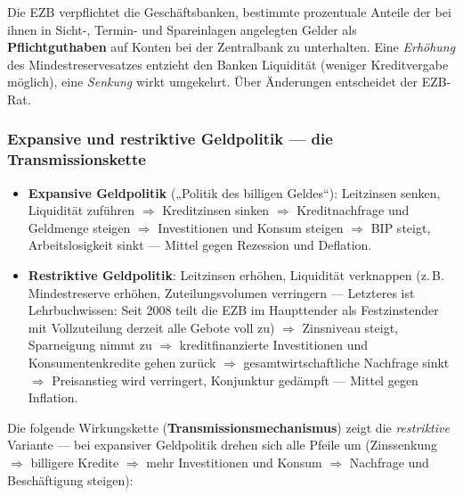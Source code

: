 \documentclass[11pt, a4paper]{article}
\begin{document}
Die EZB verpflichtet die Geschäftsbanken, bestimmte prozentuale Anteile der bei ihnen in
Sicht-, Termin- und Spareinlagen angelegten Gelder als \textbf{Pflichtguthaben} auf Konten
bei der Zentralbank zu unterhalten. Eine \emph{Erhöhung} des Mindestreservesatzes entzieht
den Banken Liquidität (weniger Kreditvergabe möglich), eine \emph{Senkung} wirkt umgekehrt.
Über Änderungen entscheidet der EZB-Rat.

\subsubsection{Expansive und restriktive Geldpolitik --- die Transmissionskette}

\begin{itemize}
  \item \textbf{Expansive Geldpolitik} („Politik des billigen Geldes``): Leitzinsen senken,
    Liquidität zuführen $\Rightarrow$ Kreditzinsen sinken $\Rightarrow$ Kreditnachfrage und
    Geldmenge steigen $\Rightarrow$ Investitionen und Konsum steigen $\Rightarrow$ BIP
    steigt, Arbeitslosigkeit sinkt --- Mittel gegen Rezession und Deflation.
  \item \textbf{Restriktive Geldpolitik}: Leitzinsen erhöhen, Liquidität verknappen
    (z.\,B. Mindestreserve erhöhen, Zuteilungsvolumen verringern --- Letzteres ist
    Lehrbuchwissen: Seit 2008 teilt die EZB im Haupttender als Festzinstender mit
    Vollzuteilung derzeit alle Gebote voll zu) $\Rightarrow$ Zinsniveau
    steigt, Sparneigung nimmt zu $\Rightarrow$ kreditfinanzierte Investitionen und
    Konsumentenkredite gehen zurück $\Rightarrow$ gesamtwirtschaftliche Nachfrage sinkt
    $\Rightarrow$ Preisanstieg wird verringert, Konjunktur gedämpft --- Mittel gegen
    Inflation.
\end{itemize}

Die folgende Wirkungskette (\textbf{Transmissionsmechanismus}) zeigt die
\emph{restriktive} Variante --- bei expansiver Geldpolitik drehen sich alle Pfeile um
(Zinssenkung $\Rightarrow$ billigere Kredite $\Rightarrow$ mehr Investitionen und Konsum
$\Rightarrow$ Nachfrage und Beschäftigung steigen):
\end{document}
